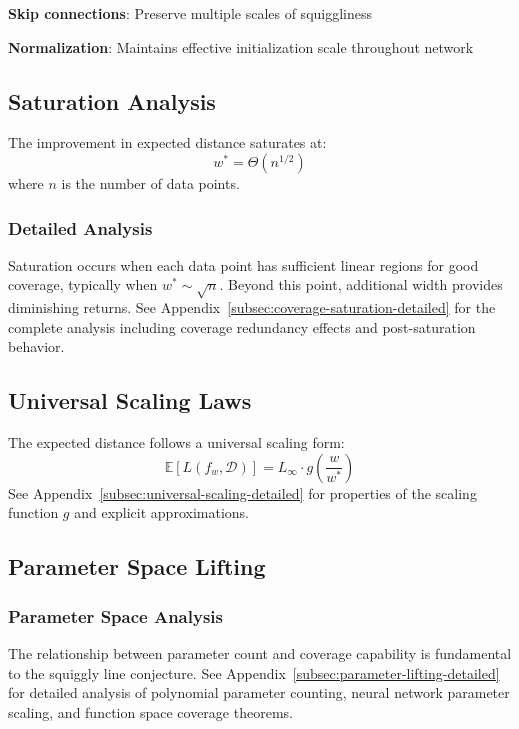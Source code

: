 \textbf{Skip connections}: Preserve multiple scales of squiggliness

\textbf{Normalization}: Maintains effective initialization scale throughout network

\subsection{Saturation Analysis}

\begin{theorem}
The improvement in expected distance saturates at:
$$w^* = \Theta(n^{1/2})$$
where $n$ is the number of data points.
\end{theorem}

\subsubsection{Detailed Analysis}

Saturation occurs when each data point has sufficient linear regions for good coverage, typically when $w^* \sim \sqrt{n}$. Beyond this point, additional width provides diminishing returns. See Appendix~\ref{subsec:coverage-saturation-detailed} for the complete analysis including coverage redundancy effects and post-saturation behavior.

\subsection{Universal Scaling Laws}

\begin{theorem}
The expected distance follows a universal scaling form:
$$\mathbb{E}[L(f_w, \mathcal{D})] = L_\infty \cdot g\left(\frac{w}{w^*}\right)$$
See Appendix~\ref{subsec:universal-scaling-detailed} for properties of the scaling function $g$ and explicit approximations.
\end{theorem}

\subsection{Parameter Space Lifting}

\subsubsection{Parameter Space Analysis}

The relationship between parameter count and coverage capability is fundamental to the squiggly line conjecture. See Appendix~\ref{subsec:parameter-lifting-detailed} for detailed analysis of polynomial parameter counting, neural network parameter scaling, and function space coverage theorems.

